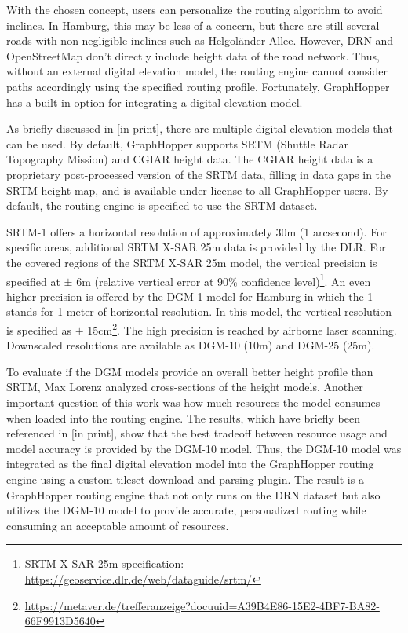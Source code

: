 With the chosen concept, users can personalize the routing algorithm to avoid inclines. In Hamburg, this may be less of a concern, but there are still several roads with non-negligible inclines such as Helgoländer Allee. However, DRN and OpenStreetMap don't directly include height data of the road network. Thus, without an external digital elevation model, the routing engine cannot consider paths accordingly using the specified routing profile. Fortunately, GraphHopper has a built-in option for integrating a digital elevation model.

As briefly discussed in [in print], there are multiple digital elevation models that can be used. By default, GraphHopper supports SRTM (Shuttle Radar Topography Mission) \cite{farr_shuttle_2000, farr_shuttle_2007} and CGIAR \cite{jarvis_hole_2008} height data. The CGIAR height data is a proprietary post-processed version of the SRTM data, filling in data gaps in the SRTM height map, and is available under license to all GraphHopper users. By default, the routing engine is specified to use the SRTM dataset.

SRTM-1 offers a horizontal resolution of approximately 30m (1 arcsecond). For specific areas, additional SRTM X-SAR 25m data is provided by the DLR. For the covered regions of the SRTM X-SAR 25m model, the vertical precision is specified at $\pm$ 6m (relative vertical error at 90\% confidence level)\footnote{SRTM X-SAR 25m specification: \url{https://geoservice.dlr.de/web/dataguide/srtm/}}. An even higher precision is offered by the DGM-1 model for Hamburg in which the 1 stands for 1 meter of horizontal resolution. In this model, the vertical resolution is specified as $\pm$ 15cm\footnote{\url{https://metaver.de/trefferanzeige?docuuid=A39B4E86-15E2-4BF7-BA82-66F9913D5640}}. The high precision is reached by airborne laser scanning. Downscaled resolutions are available as DGM-10 (10m) and DGM-25 (25m).

To evaluate if the DGM models provide an overall better height profile than SRTM, Max Lorenz analyzed cross-sections of the height models. Another important question of this work was how much resources the model consumes when loaded into the routing engine. The results, which have briefly been referenced in [in print], show that the best tradeoff between resource usage and model accuracy is provided by the DGM-10 model. Thus, the DGM-10 model was integrated as the final digital elevation model into the GraphHopper routing engine using a custom tileset download and parsing plugin. The result is a GraphHopper routing engine that not only runs on the DRN dataset but also utilizes the DGM-10 model to provide accurate, personalized routing while consuming an acceptable amount of resources. 


